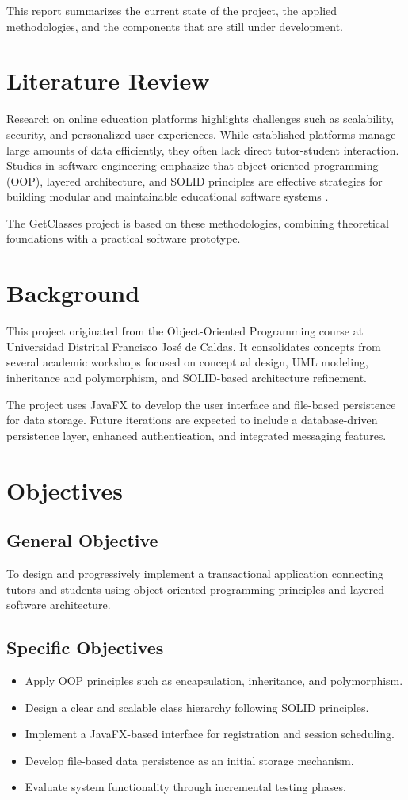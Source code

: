 \documentclass[12pt,a4paper]{report}
\begin{document}
This report summarizes the current state of the project, the applied methodologies, and the components that are still under development.


\chapter{Literature Review}
Research on online education platforms highlights challenges such as scalability, security, and personalized user experiences. While established platforms manage large amounts of data efficiently, they often lack direct tutor-student interaction. Studies in software engineering emphasize that object-oriented programming (OOP), layered architecture, and SOLID principles are effective strategies for building modular and maintainable educational software systems \cite{b1,b2,b3}.


The GetClasses project is based on these methodologies, combining theoretical foundations with a practical software prototype.


\chapter{Background}
This project originated from the Object-Oriented Programming course at Universidad Distrital Francisco Jos\'e de Caldas. It consolidates concepts from several academic workshops focused on conceptual design, UML modeling, inheritance and polymorphism, and SOLID-based architecture refinement.


The project uses JavaFX to develop the user interface and file-based persistence for data storage. Future iterations are expected to include a database-driven persistence layer, enhanced authentication, and integrated messaging features.


\chapter{Objectives}
\section{General Objective}
To design and progressively implement a transactional application connecting tutors and students using object-oriented programming principles and layered software architecture.

\section{Specific Objectives}
\begin{itemize}
    \item Apply OOP principles such as encapsulation, inheritance, and polymorphism.
    \item Design a clear and scalable class hierarchy following SOLID principles.
    \item Implement a JavaFX-based interface for registration and session scheduling.
    \item Develop file-based data persistence as an initial storage mechanism.
    \item Evaluate system functionality through incremental testing phases.
\end{itemize}
\end{document}
